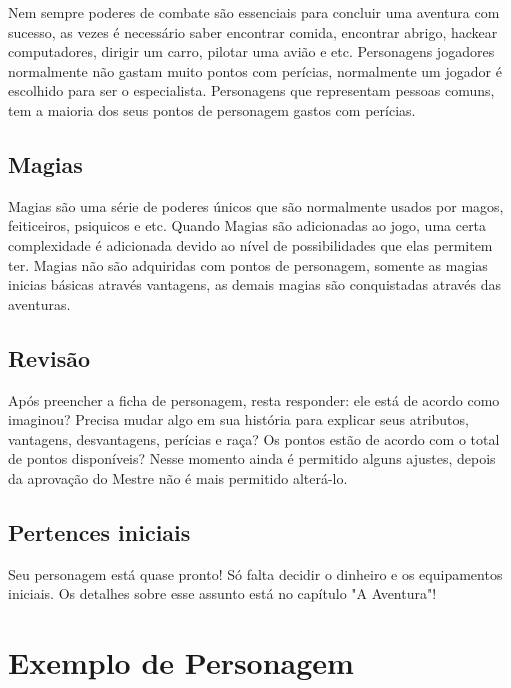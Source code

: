 Nem sempre poderes de combate são essenciais para concluir uma aventura com sucesso, as vezes é necessário saber encontrar comida, encontrar abrigo, hackear computadores, dirigir um carro, pilotar uma avião e etc. Personagens jogadores normalmente não gastam muito pontos com perícias, normalmente um jogador é escolhido para ser o especialista. Personagens que representam pessoas comuns, tem a maioria dos seus pontos de personagem gastos com perícias.

\subsection{Magias}

Magias são uma série de poderes únicos que são normalmente usados por magos, feiticeiros, psiquicos e etc. Quando Magias são adicionadas ao jogo, uma certa complexidade é adicionada devido ao nível de possibilidades que elas permitem ter. Magias não são adquiridas com pontos de personagem, somente as magias inicias básicas através vantagens, as demais magias são conquistadas através das aventuras.

\subsection{Revisão}

Após preencher a ficha de personagem, resta responder: ele está de acordo como imaginou? Precisa mudar algo em sua história para explicar seus atributos, vantagens, desvantagens, perícias e raça? Os pontos estão de acordo com o total de pontos disponíveis? Nesse momento ainda é permitido alguns ajustes, depois da aprovação do Mestre não é mais permitido alterá-lo.

\subsection{Pertences iniciais}

Seu personagem está quase pronto! Só falta decidir o dinheiro e os equipamentos iniciais. Os detalhes sobre esse assunto está no capítulo "A Aventura"!  

\section{Exemplo de Personagem}




